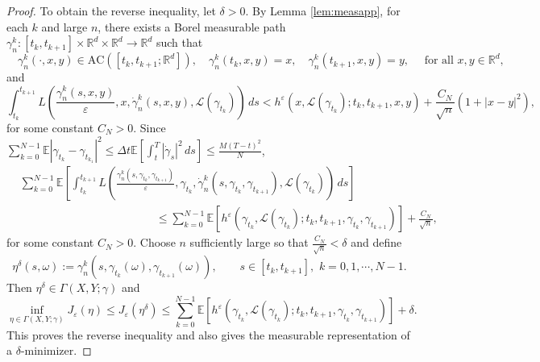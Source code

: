 \documentclass[reqno,11pt]{amsart}
\numberwithin{equation}{section}
\newcommand{\R}{\mathbb{R}} %
\newcommand{\e}{\varepsilon}
\newcommand{\ep}{\varepsilon}
\begin{document}
\begin{proof}
To obtain the reverse inequality, let $\delta>0$.
By Lemma \ref{lem:measapp}, for each $k$ and large $n$, there exists a Borel measurable path $\gamma_n^k:[t_k,t_{k+1}] \times \mathbb{R}^d \times \mathbb{R}^d \to \mathbb{R}^d$ such that
\[
\quad \gamma_n^k(\cdot, x,y) \in \mathrm{AC}([t_k, t_{k+1};\R^d]), \quad \gamma_n^k(t_k,x,y)=x, \quad \gamma_n^k(t_{k+1},x,y)=y,\quad \text{ for all }x, y\in \mathbb{R}^d,
\]
and
\[
\int_{t_k}^{t_{k+1}}
L \left(\frac{\gamma_n^k(s,x,y)}{\e}, x, \dot{\gamma}_n^k(s,x,y),\mathcal{L}(\gamma_{t_k})\right)\,ds
<
h^\e\left(x,\mathcal{L}(\gamma_{t_k});t_k, t_{k+1}, x, y\right)+\frac{C_N}{\sqrt{n}}\left(1+|x-y|^2\right),
\]
for some constant $C_N>0$. Since $ \sum_{k=0}^{N-1}\mathbb{E}\left|\gamma_{t_k}-\gamma_{t_{k_1}}\right|^2 \leq \Delta t \mathbb{E} \left[\int_t^T\left|\dot{\gamma}_s\right|^2 \, ds\right]\leq \frac{M(T-t)^2}{N}$,
\begin{equation}\label{eqn:gamm}
\begin{aligned}
&\sum_{k=0}^{N-1}\mathbb{E}\left[\int_{t_k}^{t_{k+1}}
L \left(\frac{\gamma_n^k(s,\gamma_{t_k},\gamma_{t_{k+1}})}{\varepsilon}, \gamma_{t_k}, \dot{\gamma}_n^k(s,\gamma_{t_k},\gamma_{t_{k+1}}),\mathcal{L}(\gamma_{t_k})\right)\,ds\right]\\
& \qquad \qquad \qquad\qquad\qquad\qquad\leq
\sum_{k=0}^{N-1}\mathbb{E} \left[h^\varepsilon\left(\gamma_{t_k},\mathcal{L}(\gamma_{t_k});t_k, t_{k+1}, \gamma_{t_k}, \gamma_{t_{k+1}}\right)\right]+\frac{C_N}{\sqrt{n}},
\end{aligned}
\end{equation}
for some constant $C_N>0$. Choose $n$ sufficiently large so that $\frac{C_N}{ \sqrt{n}} <\delta$ and define
\[
\eta^\delta(s, \omega):=
\gamma^k_n\left(s,\gamma_{t_k}(\omega),\gamma_{t_{k+1}}(\omega)\right),
\qquad s\in[t_k,t_{k+1}], \,\, k=0,1, \cdots, N-1.
\]
Then $\eta^\delta\in\Gamma(X,Y;\gamma)$ and
\[
\inf_{\eta\in\Gamma(X,Y;\gamma)}
J_\e(\eta) \leq J_\ep(\eta^\delta) \leq \sum_{k=0}^{N-1}\mathbb{E} \left[h^\varepsilon\left(\gamma_{t_k},\mathcal{L}(\gamma_{t_k});t_k, t_{k+1}, \gamma_{t_k}, \gamma_{t_{k+1}}\right)\right]+\delta.
\]
This proves the reverse inequality and also gives the measurable representation of a $\delta$-minimizer.




\end{proof}
\end{document}
